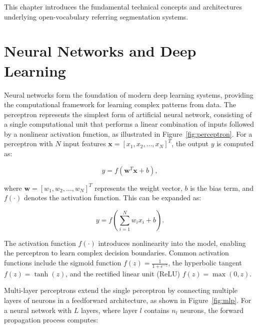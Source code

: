 \cleardoublepage
\label{chap:back}

This chapter introduces the fundamental technical concepts and architectures underlying open-vocabulary referring segmentation systems.

\section{Neural Networks and Deep Learning}

Neural networks form the foundation of modern deep learning systems, providing the computational framework for learning complex patterns from data. The perceptron represents the simplest form of artificial neural network, consisting of a single computational unit that performs a linear combination of inputs followed by a nonlinear activation function, as illustrated in Figure~\ref{fig:perceptron}. For a perceptron with $N$ input features $\mathbf{x} = [x_1, x_2, \ldots, x_N]^T$, the output $y$ is computed as:

\begin{equation}
y = f(\mathbf{w}^T\mathbf{x} + b),
\end{equation}

where $\mathbf{w} = [w_1, w_2, \ldots, w_N]^T$ represents the weight vector, $b$ is the bias term, and $f(\cdot)$ denotes the activation function. This can be expanded as:

\begin{equation}
y = f\left(\sum_{i=1}^{N} w_i x_i + b\right).
\end{equation}

The activation function $f(\cdot)$ introduces nonlinearity into the model, enabling the perceptron to learn complex decision boundaries. Common activation functions include the sigmoid function $f(z) = \frac{1}{1 + e^{-z}}$, the hyperbolic tangent $f(z) = \tanh(z)$, and the rectified linear unit (ReLU) $f(z) = \max(0, z)$.

Multi-layer perceptrons extend the single perceptron by connecting multiple layers of neurons in a feedforward architecture, as shown in Figure~\ref{fig:mlp}. For a neural network with $L$ layers, where layer $l$ contains $n_l$ neurons, the forward propagation process computes:

